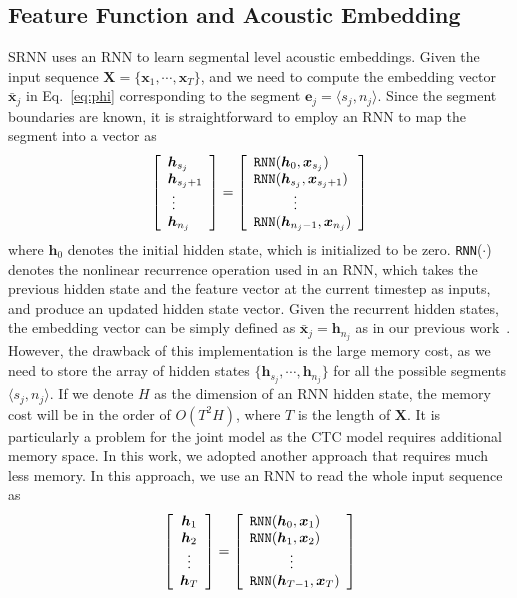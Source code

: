 \documentclass[a4paper]{article}
\begin{document}
\subsection{Feature Function and Acoustic Embedding}

SRNN uses an RNN to learn segmental level acoustic embeddings. Given the input sequence ${\bm X} = \{{\bm x}_1, \cdots, {\bm x}_T\}$, and we need to compute the embedding vector $\bar{\bm x}_j$ in Eq.~\eqref{eq:phi} corresponding to the segment ${\bm e}_j = \langle s_j, n_j\rangle$. Since the segment boundaries are known, it is straightforward to employ an RNN to map the segment into a vector as 
\begin{align}
\left [ \begin{array}{l}
{\bm h}_{s_j}  \\
{\bm h}_{s_j+1}  \\
\hskip1mm \vdots \\
{\bm h}_{n_j}   
\end{array} \right] = 
\left [ \begin{array}{l}
  \text{\tt RNN}({\bm h}_0, {\bm x}_{s_j}) \\
  \text{\tt RNN}({\bm h}_{s_j}, {\bm x}_{s_j+1}) \\
  \hskip1cm \vdots \\
  \text{\tt RNN}({\bm h}_{n_j-1}, {\bm x}_{n_j}) 
\end{array} \right]
\end{align}
where ${\bm h}_0$ denotes the initial hidden state, which is initialized to be zero. {\tt RNN}($\cdot$) denotes the nonlinear recurrence operation used in an RNN, which takes the previous hidden state and the feature vector at the current timestep as inputs, and produce an updated hidden state vector. Given the recurrent hidden states, the embedding vector can be simply defined as $\bar{\bm x}_j= {\bm h}_{n_j}$ as in our previous work~\cite{lu2016segmental}. However, the drawback of this implementation is the large memory cost, as we need to store the array of hidden states $\{{\bm h}_{s_j}, \cdots, {\bm h}_{n_j}\}$ for all the possible segments $\langle s_j, n_j\rangle$. If we denote $H$ as the dimension of an RNN hidden state, the memory cost will be in the order of $O(T^2H)$, where $T$ is the length of $\bm X$. It is particularly a problem for the joint model as the CTC model requires additional memory space. In this work, we adopted another approach that requires much less memory. In this approach, we use an RNN to read the whole input sequence as 
\begin{align}
\left [ \begin{array}{c}
{\bm h}_{1}  \\
{\bm h}_{2}  \\
\vdots \\
{\bm h}_{T}   
\end{array} \right] = 
\left [ \begin{array}{l}
  \text{\tt RNN}({\bm h}_0, {\bm x}_{1}) \\
  \text{\tt RNN}({\bm h}_1, {\bm x}_{2}) \\
 \hskip1cm \vdots \\
  \text{\tt RNN}({\bm h}_{T-1}, {\bm x}_{T}) 
\end{array} \right]
\end{align}
\end{document}
